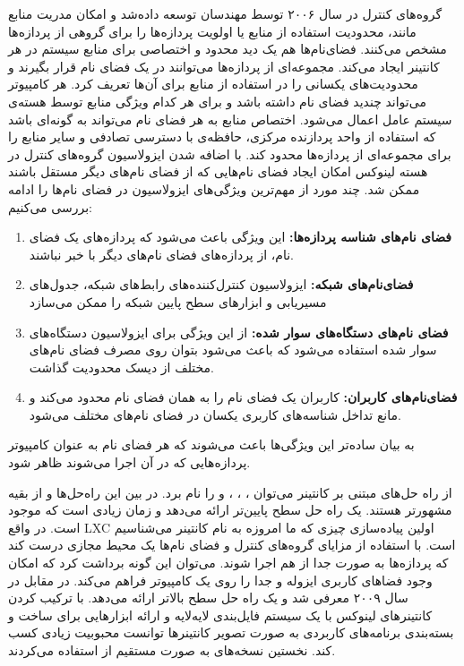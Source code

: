       گروه‌های کنترل در سال ۲۰۰۶ توسط مهندسان  توسعه داده‌شد و امکان مدریت منابع مانند، محدودیت استفاده از منابع یا اولویت پردازه‌ها را برای گروهی از پردازه‌ها مشخص می‌کنند.
      فضای‌نام‌ها هم یک دید محدود و اختصاصی برای منابع سیستم در هر کانتینر ایجاد می‌کند.
      مجموعه‌ای از پردازه‌ها می‌توانند در یک فضای نام قرار بگیرند و محدودیت‌های یکسانی را در استفاده از منابع برای آن‌ها تعریف کرد.
      هر کامپیوتر می‌تواند چندید فضای نام داشته باشد و برای هر کدام ویژگی منابع توسط هسته‌ی سیستم عامل اعمال می‌شود.
      اختصاص منابع به هر فضای نام می‌تواند به گونه‌ای باشد که استفاده از واحد پردازنده مرکزی، حافظه‌ی با دسترسی تصادفی و سایر منابع را برای مجموعه‌ای از پردازه‌ها محدود کند.
      با اضافه شدن ایزولاسیون گروه‌های کنترل در هسته لینوکس امکان ایجاد فضای نام‌هایی که از فضای نام‌های دیگر مستقل باشند ممکن شد.
      چند مورد از مهم‌ترین ویژگی‌های ایزولاسیون در فضای نام‌ها را ادامه بررسی می‌کنیم:
      \begin{enumerate}
        \item \textbf{فضای نام‌های شناسه پردازه‌ها:} این ویژگی باعث می‌شود که پردازه‌های یک فضای نام، از پردازه‌های فضای نام‌های دیگر با خبر نباشند.
        \item \textbf{فضای‌نام‌های شبکه:} ایزولاسیون کنترل‌کننده‌های رابط‌های‌ شبکه، جدول‌های مسیریابی و ابزار‌های سطح پایین شبکه را ممکن می‌سازد
        \item \textbf{فضای نام‌های دستگاه‌های سوار شده:} از این ویژگی برای ایزولاسیون دستگاه‌های سوار شده استفاده می‌شود که باعث می‌شود بتوان روی مصرف فضای نام‌های مختلف از دیسک محدودیت گذاشت.
        \item \textbf{فضای‌نام‌های کاربران:} کاربران یک فضای نام را به همان فضای نام محدود می‌کند و مانع تداخل شناسه‌های کاربری یکسان در فضای نام‌های مختلف می‌شود.
      \end{enumerate}
      به بیان ساده‌تر این ویژگی‌ها باعث می‌شوند که هر فضای نام به عنوان کامپیوتر پردازه‌هایی که در آن اجرا می‌شوند ظاهر شود.

      از راه حل‌های مبتنی بر کانتینر می‌توان \cite{2019vserver}، \cite{2019openvz}، \cite{2019containers}، \cite{2019docker} و \cite{2019rtk} را نام برد.
      در بین این راه‌حل‌ها  و  از بقیه مشهورتر هستند.
       یک راه حل سطح پایین‌تر ارائه می‌دهد و زمان زیادی است که موجود است.
      در واقع LXC اولین پیاده‌سازی چیزی که ما امروزه به نام کانتینر می‌شناسیم است.
       با استفاده از مزایای گروه‌های کنترل و فضای نام‌ها یک محیط مجازی درست کند که پردازه‌ها به صورت جدا از هم اجرا شوند.
      می‌توان این گونه برداشت کرد که  امکان وجود فضا‌های کاربری ایزوله و جدا را روی یک کامپیوتر فراهم می‌کند.
      در مقابل  در سال ۲۰۰۹ معرفی شد و یک راه حل سطح بالاتر ارائه می‌دهد.
       با ترکیب کردن کانتینر‌های لینوکس با یک سیستم فایل‌بندی لایه‌لایه و ارائه ابزار‌هایی برای ساخت و بسته‌بندی برنامه‌های کاربردی به صورت تصویر کانتینر‌ها توانست محبوبیت زیادی کسب کند.
      نخستین نسخه‌های  به صورت مستقیم از  استفاده می‌کردند.
